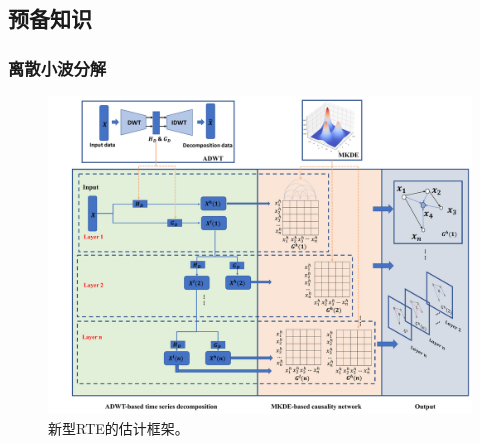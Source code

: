 \subsection{预备知识}
\subsubsection{离散小波分解}

\begin{figure}[!htbp]
\centering
\includegraphics[scale=0.3]{./ch3/fig3_1.pdf}
\caption{新型RTE的估计框架。} \label{figure1}

\end{figure}

